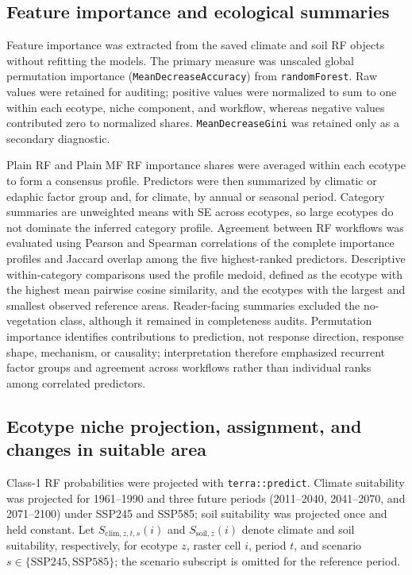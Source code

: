 \documentclass[11pt]{article}
\begin{document}
\subsection{Feature importance and ecological summaries}

Feature importance was extracted from the saved climate and soil RF objects
without refitting the models. The primary measure was unscaled global
permutation importance (\texttt{MeanDecrease\allowbreak Accuracy}) from
\texttt{randomForest}. Raw values were retained for auditing; positive values
were normalized to sum to one within each ecotype, niche component, and
workflow, whereas negative values contributed zero to normalized shares.
\texttt{MeanDecreaseGini} was retained only as a secondary diagnostic.

Plain RF and Plain MF RF importance shares were averaged within each ecotype
to form a consensus profile. Predictors were then summarized by climatic or
edaphic factor group and, for climate, by annual or seasonal period. Category
summaries are unweighted means with SE across ecotypes, so large ecotypes do
not dominate the inferred category profile. Agreement between RF workflows
was evaluated using Pearson and Spearman correlations of the complete
importance profiles and Jaccard overlap among the five highest-ranked
predictors. Descriptive within-category comparisons used the profile medoid,
defined as the ecotype with the highest mean pairwise cosine similarity, and
the ecotypes with the largest and smallest observed reference areas.
Reader-facing summaries excluded the no-vegetation class, although it remained
in completeness audits. Permutation importance identifies contributions to
prediction, not response direction, response shape, mechanism, or causality;
interpretation therefore emphasized recurrent factor groups and agreement
across workflows rather than individual ranks among correlated predictors.

\subsection{Ecotype niche projection, assignment, and changes in suitable area}

Class-1 RF probabilities were projected with \texttt{terra::predict}. Climate suitability was projected for 1961--1990 and three future periods (2011--2040, 2041--2070, and 2071--2100) under SSP245 and SSP585; soil suitability was projected once and held constant. Let $S_{\mathrm{clim},z,t,s}(i)$ and $S_{\mathrm{soil},z}(i)$ denote climate and soil suitability, respectively, for ecotype $z$, raster cell $i$, period $t$, and scenario $s\in\{\mathrm{SSP245},\mathrm{SSP585}\}$; the scenario subscript is omitted for the reference period.
\end{document}
